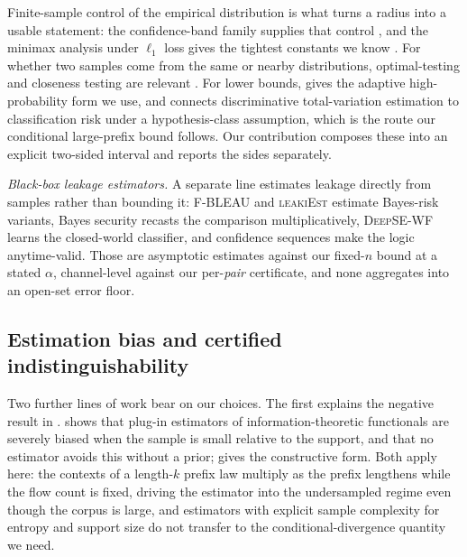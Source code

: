 Finite-sample control of the empirical distribution is what turns a radius into
a usable statement: the confidence-band family supplies that control
\citep{wei2011dkwtwo,reeve2024dkwmassart}, and the minimax analysis under
$\ell_1$ loss gives the tightest constants we know
\citep{han2015l1distribution,jiao2018l1distance}. For whether two samples come
from the same or nearby distributions, optimal-testing and closeness testing are
relevant \citep{diakonikolas2020highprob,chan2013closeness}. For lower bounds,
\citet{michel2020high} gives the adaptive high-probability form we use, and
\citet{tao2024discriminative} connects discriminative total-variation estimation
to classification risk under a hypothesis-class assumption, which is the route
our conditional large-prefix bound follows. Our contribution composes these into an
explicit two-sided interval and reports the sides separately.

\emph{Black-box leakage estimators.} A separate line estimates leakage directly
from samples rather than bounding it: \textsc{F-BLEAU}
\citep{cherubin2019fbleau} and \textsc{leakiEst} \citep{chothia2013leakiest}
estimate Bayes-risk variants, Bayes security
\citep{chatzikokolakis2023bayes} recasts the comparison multiplicatively,
\textsc{DeepSE-WF} \citep{veicht2023deepsewf} learns the closed-world
classifier, and confidence sequences \citep{howard2021timeuniform} make the
logic anytime-valid. Those are asymptotic estimates against our fixed-$n$ bound
at a stated $\alpha$, channel-level against our per-\emph{pair} certificate,
and none aggregates into an open-set error floor.

\subsection{Estimation bias and certified indistinguishability}
\label{sec:related/growth}

Two further lines of work bear on our choices. The first explains the negative
result in . \citet{paninski2003entropy} shows that
plug-in estimators of information-theoretic functionals are severely biased when
the sample is small relative to the support, and that no estimator avoids this
without a prior; \citet{nemenman2002entropy} gives the constructive form. Both
apply here: the contexts of a length-$k$ prefix law multiply as the prefix
lengthens while the flow count is fixed, driving the estimator into the
undersampled regime even though the corpus is large, and estimators with explicit
sample complexity for entropy and support size \citep{valiant2011estimating} do
not transfer to the conditional-divergence quantity we need.

